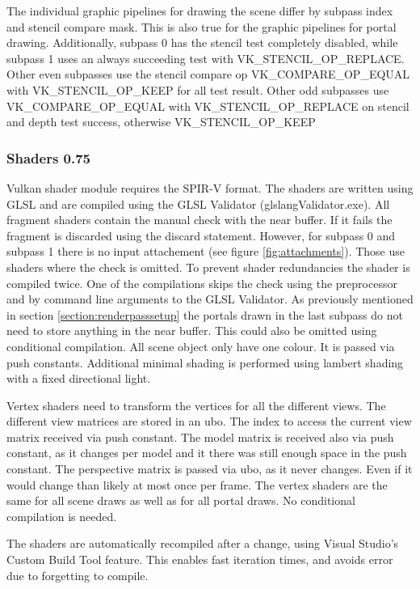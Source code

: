 The individual  graphic pipelines for drawing the scene differ by subpass index and stencil compare mask. This is also true for the graphic pipelines for portal drawing. Additionally, subpass 0 has the stencil test completely disabled, while subpass 1 uses an always succeeding test with VK\_STENCIL\_OP\_REPLACE. Other even subpasses use the stencil compare op VK\_COMPARE\_OP\_EQUAL with VK\_STENCIL\_OP\_KEEP for all test result. Other odd subpasses use VK\_COMPARE\_OP\_EQUAL with VK\_STENCIL\_OP\_REPLACE on stencil and depth test success, otherwise VK\_STENCIL\_OP\_KEEP

\subsubsection{Shaders 0.75}
Vulkan shader module requires the SPIR-V format. The shaders are written using GLSL and are compiled using the GLSL Validator (glslangValidator.exe). All fragment shaders contain the manual check with the near buffer. If it fails the fragment is discarded using the discard statement. However, for subpass 0 and subpass 1 there is no input attachement (see figure \ref{fig:attachments}). Those use shaders where the check is omitted. To prevent shader redundancies the shader is compiled twice. One of the compilations skips the check using the preprocessor and by command line arguments to the GLSL Validator. As previously mentioned in section \ref{section:renderpasssetup} the portals drawn in the last subpass do not need to store anything in the near buffer. This could also be omitted using conditional compilation. All scene object only have one colour. It is passed via push constants. Additional minimal shading is performed using lambert shading with a fixed directional light.

Vertex shaders need to transform the vertices for all the different views. The different view matrices are stored in an \gls{ubo}. The index to access the current view matrix received via push constant. The model matrix is received also via push constant, as it changes per model and it there was still enough space in the push constant. The perspective matrix is passed via \gls{ubo}, as it never changes. Even if it would change than likely at most once per frame. The vertex shaders are the same for all scene draws as well as for all portal draws. No conditional compilation is needed.


The shaders are automatically recompiled after a change, using Visual Studio's Custom Build Tool feature. This enables fast iteration times, and avoids error due to forgetting to compile.

